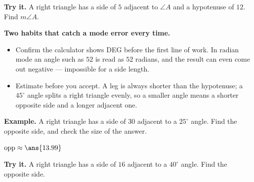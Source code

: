 \documentclass[12pt]{article}
\begin{document}
\begin{tryitbox}
\textbf{Try it.} A right triangle has a side of $5$ adjacent to $\angle A$ and a
hypotenuse of $12$. Find $m\angle A$.\\[2pt]
\end{tryitbox}


\begin{formulabox}
\textbf{Two habits that catch a mode error every time.}
\begin{itemize}[leftmargin=0.6cm, itemsep=1pt, topsep=2pt]
  \item Confirm the calculator shows \textsf{DEG} before the first line of work.
        In radian mode an angle such as $52$ is read as $52$ radians, and the
        result can even come out negative --- impossible for a side length.
  \item Estimate before you accept. A leg is always shorter than the
        hypotenuse; a $45^\circ$ angle splits a right triangle evenly, so a
        smaller angle means a shorter opposite side and a longer adjacent one.
\end{itemize}
\end{formulabox}

\begin{examplebox}
\textbf{Example.} A right triangle has a side of $30$ adjacent to a $25^\circ$
angle. Find the opposite side, and check the size of the answer.

$\text{opp} \approx \ans{13.99}$
\end{examplebox}

\begin{tryitbox}
\textbf{Try it.} A right triangle has a side of $16$ adjacent to a $40^\circ$
angle. Find the opposite side.\\[2pt]
\end{tryitbox}
\end{document}

